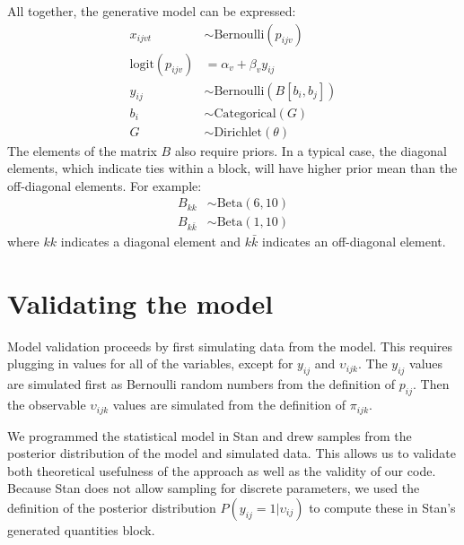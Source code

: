 \documentclass[reqno,12pt,a4paper]{amsart}
\begin{document}
All together, the generative model can be expressed:
\begin{align*}
	x_{ijvt} &\sim \mathrm{Bernoulli}( p_{ijv} )\\
	\mathrm{logit}(p_{ijv}) &= \alpha_v + \beta_v y_{ij}\\
	y_{ij} &\sim \mathrm{Bernoulli}( B[b_i,b_j] )\\
	b_i &\sim \mathrm{Categorical}( G )\\
	G &\sim \mathrm{Dirichlet}( \theta )
\end{align*}
The elements of the matrix $B$ also require priors. In a typical case, the diagonal elements, which indicate ties within a block, will have higher prior mean than the off-diagonal elements. For example:
\begin{align*}
	B_{kk} &\sim \mathrm{Beta}( 6 , 10 )\\
	B_{k \bar k} &\sim \mathrm{Beta}( 1 , 10 )
\end{align*}
where $kk$ indicates a diagonal element and $k \bar k$ indicates an off-diagonal element. 

\section{Validating the model}

Model validation proceeds by first simulating data from the model. This requires plugging in values for all of the variables, except for $y_{ij}$ and $\upsilon_{ijk}$. The $y_{ij}$ values are simulated first as Bernoulli random numbers from the definition of $p_{ij}$. Then the observable $\upsilon_{ijk}$ values are simulated from the definition of $\pi_{ijk}$. 

We programmed the statistical model in Stan and drew samples from the posterior distribution of the model and simulated data. This allows us to validate both theoretical usefulness of the approach as well as the validity of our code. Because Stan does not allow sampling for discrete parameters, we used the definition of the posterior distribution $P(y_{ij}=1|\upsilon_{ij})$ to compute these in Stan's generated quantities block.


%
%
\end{document}
